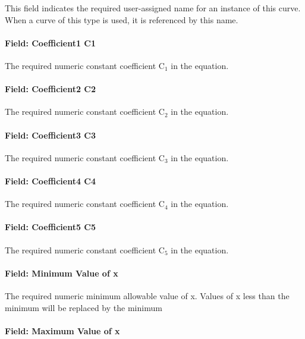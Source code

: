 This field indicates the required user-assigned name for an instance of this curve. When a curve of this type is used, it is referenced by this name.

\paragraph{Field: Coefficient1 C1}\label{field-coefficient1-c1-5}

The required numeric constant coefficient C\(_{1}\) in the equation.

\paragraph{Field: Coefficient2 C2}\label{field-coefficient2-c2-5}

The required numeric constant coefficient C\(_{2}\) in the equation.

\paragraph{Field: Coefficient3 C3}\label{field-coefficient3-c3-5}

The required numeric constant coefficient C\(_{3}\) in the equation.

\paragraph{Field: Coefficient4 C4}\label{field-coefficient4-c4-2}

The required numeric constant coefficient C\(_{4}\) in the equation.

\paragraph{Field: Coefficient5 C5}\label{field-coefficient5-c5-1}

The required numeric constant coefficient C\(_{5}\) in the equation.

\paragraph{Field: Minimum Value of x}\label{field-minimum-value-of-x-17}

The required numeric minimum allowable value of x. Values of x less than the minimum will be replaced by the minimum

\paragraph{Field: Maximum Value of x}\label{field-maximum-value-of-x-18}

